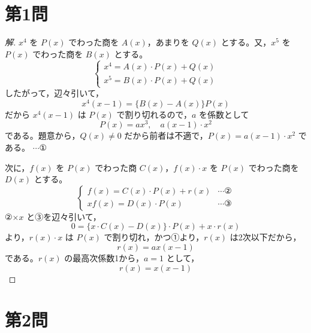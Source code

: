 \documentclass[../main.tex]{subfiles}
\begin{document}
\section*{第1問}

\begin{proof}[解]
  $x^4$ を $P(x)$ でわった商を $A(x)$，あまりを $Q(x)$ とする。又，$x^5$ を $P(x)$ でわった商を $B(x)$ とする。
  \[
    \begin{cases}
      x^4=A(x)\cdot P(x)+Q(x) \\
      x^5=B(x)\cdot P(x)+Q(x)
    \end{cases}
  \]
  したがって，辺々引いて，
  \[
    x^4(x-1)=\{B(x)-A(x)\}P(x)
  \]
  だから $x^4(x-1)$ は $P(x)$ で割り切れるので，$a$ を係数として
  \[
    P(x)=ax^3, \quad a(x-1)\cdot x^2
  \]
  である。題意から，$Q(x)\ne0$ だから前者は不適で，$P(x)=a(x-1)\cdot x^2$ である。 $\cdots$①

  次に，$f(x)$ を $P(x)$ でわった商 $C(x)$，$f(x)\cdot x$ を $P(x)$ でわった商を $D(x)$ とする。
  \[
    \begin{cases}
      f(x)=C(x)\cdot P(x)+r(x) & \cdots \text{②} \\
      xf(x)=D(x)\cdot P(x) & \cdots \text{③}
    \end{cases}
  \]
  ②$\times x$ と③を辺々引いて，
  \[
    0=\{x\cdot C(x)-D(x)\}\cdot P(x)+x\cdot r(x)
  \]
  より，$r(x)\cdot x$ は $P(x)$ で割り切れ，かつ①より，$r(x)$ は2次以下だから，
  \[
    r(x)=ax(x-1)
  \]
  である。$r(x)$ の最高次係数1から，$a=1$ として，
  \[
    r(x)=x(x-1)
  \]
\end{proof}

\newpage

\section*{第2問}
\end{document}
